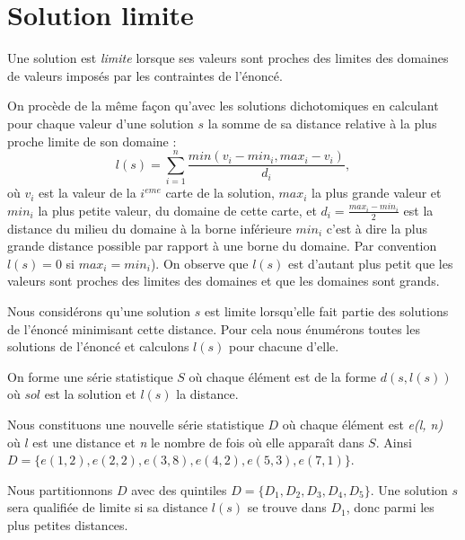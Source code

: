 \documentclass[a4paper, 12]{article}
\newcommand\set[1]{\ensuremath{\{#1\}}}
\begin{document}
\section{Solution limite}
Une solution est \emph{limite} lorsque ses valeurs sont proches des limites des domaines de valeurs imposés par les contraintes de l’énoncé. 

On procède de la même façon qu’avec les solutions dichotomiques en calculant pour chaque valeur d’une solution $s$ la somme  de sa distance relative à la plus proche limite de son domaine :
$$ l(s) = \sum_{i=1}^{n} \frac{min(v_i - min_i, max_i - v_i)}{d_i},$$ 
où $v_i$ est la valeur de la $i^{eme}$ carte de la solution, $max_i$ la plus grande valeur et $min_i$ la plus petite valeur, du domaine de cette carte,  et $d_i = \frac{max_i - min_i}{2}$ est la distance du milieu du domaine  à la borne inférieure $min_i$ c’est à dire la plus grande distance possible par rapport à une borne du domaine. Par convention $l(s) = 0$ si 
$max_i = min_i$).
On observe que $l(s)$ est d’autant plus petit que les valeurs sont proches des limites des domaines et que les domaines sont grands.

Nous considérons qu’une solution $s$ est limite lorsqu’elle fait partie des solutions de l’énoncé minimisant cette distance. Pour cela nous énumérons toutes les solutions de l’énoncé et calculons $l(s)$ pour chacune d’elle. 

On forme une série statistique $S$ où chaque élément est de la forme $d(s, l(s))$ où $sol$ est la solution et $l(s)$ la distance.

Nous constituons une nouvelle série statistique $D$ où chaque élément est \emph{e(l, n)} où $l$ est une distance et \emph{n}  le nombre de fois où elle apparaît dans $S$. Ainsi 
$D = \set{e(1, 2), e(2, 2), e(3, 8), e(4, 2), e(5, 3), e(7, 1) }$.

Nous partitionnons $D$ avec des quintiles $D = \set{D_1, D_2, D_3, D_4, D_5}$. Une solution $s$ sera qualifiée de limite si sa distance $l(s)$ se trouve dans $D_1$, donc parmi les plus petites distances. 
\end{document}
